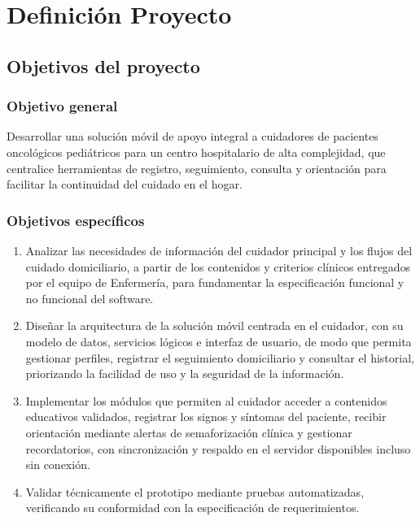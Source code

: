 \chapter[Definición del Proyecto]{Definición Proyecto}

\section[Objetivos del Proyecto]{Objetivos del proyecto}

\subsection{Objetivo general}

Desarrollar una solución móvil de apoyo integral a cuidadores de pacientes
oncológicos pediátricos para un centro hospitalario de alta complejidad, que
centralice herramientas de registro, seguimiento, consulta y orientación para
facilitar la continuidad del cuidado en el hogar.

\subsection{Objetivos específicos}

\begin{enumerate}
    \item Analizar las necesidades de información del cuidador principal y los
    flujos del cuidado domiciliario, a partir de los contenidos y criterios
    clínicos entregados por el equipo de Enfermería, para fundamentar la
    especificación funcional y no funcional del software.
    \item Diseñar la arquitectura de la solución móvil centrada en el cuidador,
    con su modelo de datos, servicios lógicos e interfaz de usuario, de modo que
    permita gestionar perfiles, registrar el seguimiento domiciliario y consultar
    el historial, priorizando la facilidad de uso y la seguridad de la
    información.
    \item Implementar los módulos que permiten al cuidador acceder a contenidos
    educativos validados, registrar los signos y síntomas del paciente, recibir
    orientación mediante alertas de semaforización clínica y gestionar
    recordatorios, con sincronización y respaldo en el servidor disponibles incluso
    sin conexión.
    \item Validar técnicamente el prototipo mediante pruebas automatizadas,
    verificando su conformidad con la especificación de requerimientos.
\end{enumerate}

